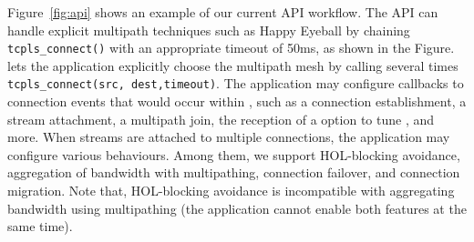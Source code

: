 Figure~\ref{fig:api} shows an example of our current API workflow. The API can
handle explicit multipath techniques such as Happy Eyeball by chaining
\texttt{tcpls\_connect()} with an appropriate timeout of 50ms, as shown in the
Figure. \tcpls lets the application explicitly choose the multipath mesh by
calling several times \texttt{tcpls\_connect(src, dest,timeout)}. The
application may configure callbacks to connection events that would occur within
\tcpls, such as a connection establishment, a stream attachment, a multipath
join, the reception of a \tcp option to tune \tcp, and more. When
streams are attached to multiple \tcp connections, the application may configure
various \tcpls behaviours. Among them, we support HOL-blocking avoidance,
aggregation of bandwidth with multipathing, connection failover, and connection
migration. Note that, HOL-blocking avoidance is incompatible with
aggregating bandwidth using multipathing (the application cannot enable both
features at the same time).





